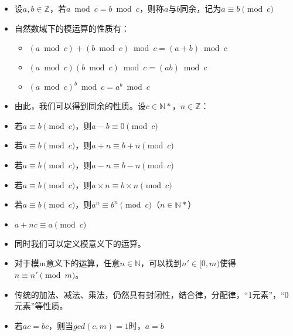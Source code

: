 \documentclass{beamer}
\begin{document}
\begin{frame}
\begin{itemize}[<+-| alert@+>]
	\item 设$a,b \in \mathbb{Z}$，若$a \bmod c = b\bmod c$，则称$a$与$b$同余，记为$a \equiv b\pmod c$
	\item 自然数域下的模运算的性质有：
	\begin{itemize}[<+-| alert@+>]
		\item $(a \bmod c) + (b \bmod c) \bmod c= (a+b)\bmod c$
		\item $(a \bmod c)(b \bmod c)\bmod c = (ab)\bmod c$
		\item $(a\bmod c)^b \bmod c=a^b \bmod c$
	\end{itemize}
\end{itemize}
\end{frame}

\begin{frame}
\begin{itemize}[<+-| alert@+>]
	\item 由此，我们可以得到同余的性质。设$c \in \mathbb{N*}$，$n \in \mathbb{Z}$：
	\item 若$a \equiv b\pmod c$，则$a-b\equiv 0\pmod c$
	\item 若$a \equiv b\pmod c$，则$a+n \equiv b+n\pmod c$
	\item 若$a \equiv b\pmod c$，则$a-n \equiv b-n\pmod c$
	\item 若$a \equiv b\pmod c$，则$a\times n \equiv b\times n\pmod c$
	\item 若$a \equiv b\pmod c$，则$a^n \equiv b^n\pmod c$（$n \in \mathbb{N*}$）
	\item $a+nc \equiv a\pmod c$
\end{itemize}
\end{frame}

\begin{frame}
\begin{itemize}[<+-| alert@+>]
	\item 同时我们可以定义模意义下的运算。
	\item 对于模m意义下的运算，任意$n \in \mathbb{N}$，可以找到$n' \in [0,m)$使得$n \equiv n' \pmod m$。
	\item 传统的加法、减法、乘法，仍然具有封闭性，结合律，分配律，“1元素”，“0元素”等性质。
	\item 若$ac=bc$，则当$gcd(c,m)=1$时，$a=b$
\end{itemize}
\end{frame}
\end{document}
